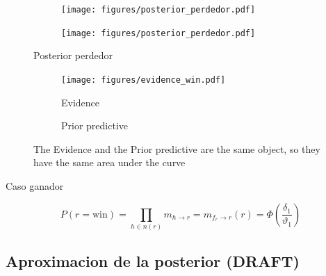 \documentclass[article]{jss}
\begin{document}
\begin{appendix}
\begin{figure}[t!]
\centering
  \begin{subfigure}[t]{0.48\textwidth}
  \texttt{[image: figures/posterior\_perdedor.pdf]}
  \caption{}
  \label{posterior_perdedor_image}
  \end{subfigure}
  \begin{subfigure}[t]{0.48\textwidth}
  \texttt{[image: figures/posterior\_perdedor.pdf]}
  \caption{}
  \label{posterior_perdedor_distribution}
  \end{subfigure}
  \caption{Posterior perdedor}
  \label{posterior_perdedor}
\end{figure}

 \begin{figure}[t!]
\centering
  \begin{subfigure}[t]{0.48\textwidth}
  \texttt{[image: figures/evidence\_win.pdf]}
  \caption{Evidence}
  \label{fig:evidence_win}
  \end{subfigure}
  \begin{subfigure}[t]{0.48\textwidth}
  \caption{Prior predictive}
  \label{fig:prior_predictive_win}
  \end{subfigure}
  \caption{The Evidence and the Prior predictive are the same object, so they have the same area under the curve}
  \label{fig:evidence_prior_predictive}
\end{figure}
 
 Caso ganador
 
 \begin{equation}\label{eq:prior_predictive}
  P(r=\text{win}) = \prod_{h \in n(r)} m_{h \rightarrow r}  = m_{f_r \rightarrow r}(r) =  \Phi(\frac{\delta_1}{\vartheta_1}) 
 \end{equation}

 

 
 
 
 
 
 
 
 
 
 
 
 
 
 
 
 
 
 
 
 
 
 
 
 
 

 
 \subsection{Aproximacion de la posterior (DRAFT)}


\end{appendix}
\end{document}
